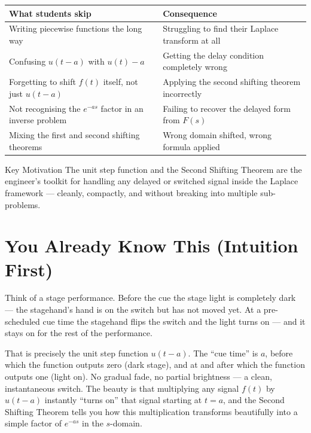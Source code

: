 \documentclass[12pt,a4paper]{article}
\begin{document}
\begin{center}
\begin{tabular}{@{}ll@{}}
\toprule
\textbf{What students skip} & \textbf{Consequence} \\
\midrule
Writing piecewise functions the long way
  & Struggling to find their Laplace transform at all \\
Confusing $u(t-a)$ with $u(t) - a$
  & Getting the delay condition completely wrong \\
Forgetting to shift $f(t)$ itself, not just $u(t-a)$
  & Applying the second shifting theorem incorrectly \\
Not recognising the $e^{-as}$ factor in an inverse problem
  & Failing to recover the delayed form from $F(s)$ \\
Mixing the first and second shifting theorems
  & Wrong domain shifted, wrong formula applied \\
\bottomrule
\end{tabular}
\end{center}

\begin{learnbox}{Key Motivation}
The unit step function and the Second Shifting Theorem are the engineer's toolkit for
handling any delayed or switched signal inside the Laplace framework --- cleanly, compactly,
and without breaking into multiple sub-problems.
\end{learnbox}

\section{You Already Know This (Intuition First)}

Think of a stage performance.
Before the cue the stage light is completely dark --- the stagehand's hand is on the switch
but has not moved yet.
At a pre-scheduled cue time the stagehand flips the switch and the light turns on ---
and it stays on for the rest of the performance.

That is precisely the unit step function $u(t - a)$.
The ``cue time'' is $a$, before which the function outputs zero (dark stage), and at and
after which the function outputs one (light on).
No gradual fade, no partial brightness --- a clean, instantaneous switch.
The beauty is that multiplying any signal $f(t)$ by $u(t-a)$ instantly ``turns on'' that
signal starting at $t = a$, and the Second Shifting Theorem tells you how this multiplication
transforms beautifully into a simple factor of $e^{-as}$ in the $s$-domain.
\end{document}
